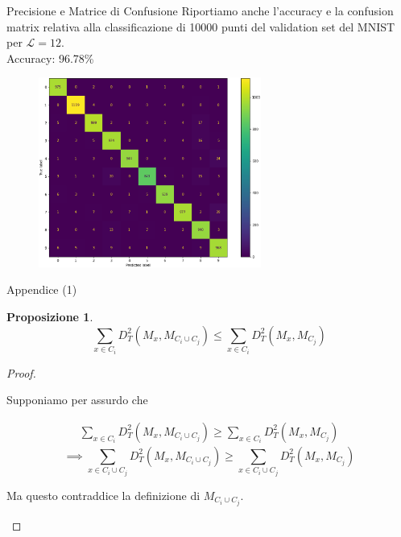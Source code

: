 \documentclass[usenames,dvipsnames,9pt]{beamer}
\theoremstyle{definition}
\newtheorem*{prop}{Proposizione}
\begin{document}
\begin{frame}{Precisione e Matrice di Confusione}
Riportiamo anche l'accuracy e la confusion matrix relativa alla classificazione di 10000 punti del validation set del MNIST per $\mathcal{L}=12$. \\
Accuracy: 96.78\%
\begin{figure}[b]
\centering
\includegraphics[width=0.65\textwidth]{graphics/confusionmatrix.eps}
\end{figure}
\end{frame}

\begin{frame}{Appendice (1)}
\begin{prop}
  \begin{equation*}
    \sum_{x \in C_{i}} D_{T}^{2}\left(M_{x}, M_{C_{i} \cup C_{j}}\right) \leq \sum_{x \in C_{i}} D_{T}^{2}\left(M_{x}, M_{C_{j}}\right)
  \end{equation*}
\end{prop}
\begin{proof}
    \begin{center}
    Supponiamo per assurdo che
    \end{center}
    \begin{gather*}
    \sum _{x\in C_{i}} D_{T}^{2}( M_{x} ,M_{C_{i} \cup C_{j}}) \geq \sum _{x\in C_{i}} D_{T}^{2}( M_{x} ,M_{C_{j}})
    \end{gather*}
    \begin{equation*}
    \implies \sum _{x\in C_{i} \cup C_{j}} D_{T}^{2}( M_{x} ,M_{C_{i} \cup C_{j}}) \geq \sum _{x\in C_{i} \cup C_{j}} D_{T}^{2}( M_{x} ,M_{C_{j}})
    \end{equation*}
    \begin{center}
    Ma questo contraddice la definizione di $\displaystyle M_{C_{i} \cup C_{j}} .$
    \end{center}
\end{proof}
\end{frame}
\end{document}

